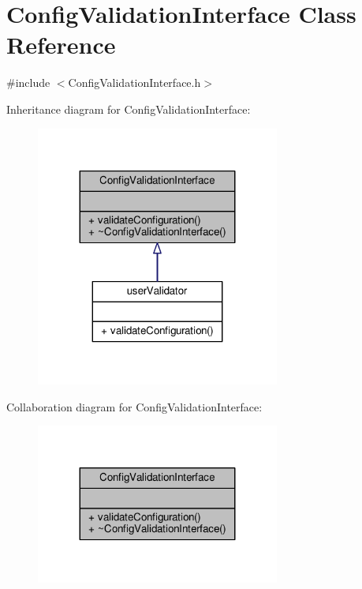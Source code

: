\hypertarget{classConfigValidationInterface}{}\section{Config\+Validation\+Interface Class Reference}
\label{classConfigValidationInterface}


{\ttfamily \#include $<$Config\+Validation\+Interface.\+h$>$}



Inheritance diagram for Config\+Validation\+Interface\+:
\nopagebreak
\begin{figure}[H]
\begin{center}
\leavevmode
\includegraphics[width=227pt]{classConfigValidationInterface__inherit__graph}
\end{center}
\end{figure}


Collaboration diagram for Config\+Validation\+Interface\+:
\nopagebreak
\begin{figure}[H]
\begin{center}
\leavevmode
\includegraphics[width=227pt]{classConfigValidationInterface__coll__graph}
\end{center}
\end{figure}
